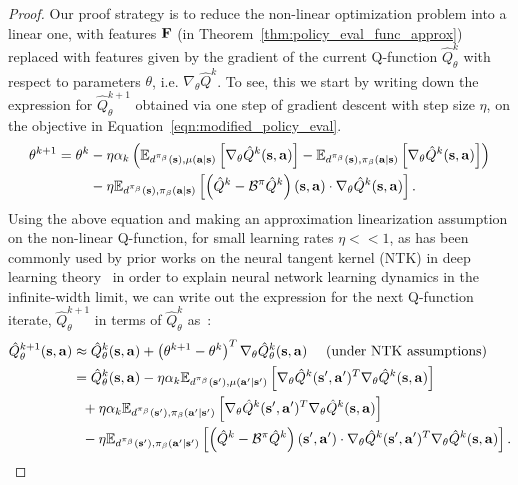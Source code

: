 \begin{proof} Our proof strategy is to reduce the non-linear optimization problem into a linear one, with features $\mathbf{F}$ (in Theorem~\ref{thm:policy_eval_func_approx}) replaced with features given by the gradient of the current Q-function $\hat{Q}^{k}_\theta$ with respect to parameters $\theta$, i.e. $\nabla_\theta \hat{Q}^k$. To see, this we start by writing down the expression for $\hat{Q}^{k+1}_\theta$ obtained via one step of gradient descent with step size $\eta$, on the objective in Equation~\ref{eqn:modified_policy_eval}.
\begin{align*}
    \theta^{k+1} = \theta^k &- \eta \alpha_k \left( \mathbb{E}_{d^{\pi_\beta}(\mathbf{s}), \mu(\mathbf{a}|\mathbf{s})}\left[\nabla_\theta \hat{Q}^{k}(\mathbf{s}, \mathbf{a})\right] - \mathbb{E}_{d^{\pi_\beta}(\mathbf{s}), {\pi_\beta}(\mathbf{a}|\mathbf{s})}\left[\nabla_\theta \hat{Q}^{k}(\mathbf{s}, \mathbf{a})\right] \right) \\ 
    &- \eta \mathbb{E}_{d^{\pi_\beta}(\mathbf{s}), {\pi_\beta}(\mathbf{a}|\mathbf{s})}\left[ \left(\hat{Q}^k - \mathcal{B}^\pi \hat{Q}^{k} \right)(\mathbf{s}, \mathbf{a}) \cdot \nabla_\theta \hat{Q}^{k}(\mathbf{s}, \mathbf{a}) \right].
\end{align*}
Using the above equation and making an approximation linearization assumption on the non-linear Q-function, for small learning rates $\eta << 1$, as has been commonly used by prior works on the neural tangent kernel (NTK) in deep learning theory~\citep{ntk} in order to explain neural network learning dynamics in the infinite-width limit, we can write out the expression for the next Q-function iterate, $\hat{Q}^{k+1}_\theta$ in terms of $\hat{Q}^k_\theta$ as~\citep{achiam2019towards,ntk}:
\begin{align*}
    \hat{Q}^{k+1}_\theta(\mathbf{s}, \mathbf{a}) &\approx \hat{Q}^k_\theta(\mathbf{s}, \mathbf{a}) + \left(\theta^{k+1} - \theta^{k}\right)^T \nabla_\theta \hat{Q}^{k}_\theta (\mathbf{s}, \mathbf{a}) ~~~~ \text{(under NTK assumptions)}\\
    &= \hat{Q}^k_\theta(\mathbf{s}, \mathbf{a}) - \eta \alpha_k \mathbb{E}_{d^{\pi_\beta}(\mathbf{s}'), \mu(\mathbf{a}'|\mathbf{s}')}\left[\nabla_\theta \hat{Q}^{k}(\mathbf{s}', \mathbf{a}')^T \nabla_\theta \hat{Q}^{k}(\mathbf{s}, \mathbf{a}) \right]\\
    &~~ + \eta \alpha_k \mathbb{E}_{d^{\pi_\beta}(\mathbf{s}'), {\pi_\beta}(\mathbf{a}'|\mathbf{s}')}\left[\nabla_\theta \hat{Q}^{k}(\mathbf{s}', \mathbf{a}')^T \nabla_\theta \hat{Q}^k(\mathbf{s}, \mathbf{a}) \right]\\
    &~~ - \eta \mathbb{E}_{d^{\pi_\beta}(\mathbf{s}'), {\pi_\beta}(\mathbf{a}'|\mathbf{s}')}\left[ \left(\hat{Q}^k - \mathcal{B}^\pi \hat{Q}^{k} \right)(\mathbf{s}', \mathbf{a}') \cdot \nabla_\theta \hat{Q}^{k}(\mathbf{s}', \mathbf{a}')^T \nabla_\theta \hat{Q}^k(\mathbf{s}, \mathbf{a}) \right].
\end{align*}

\end{proof}
